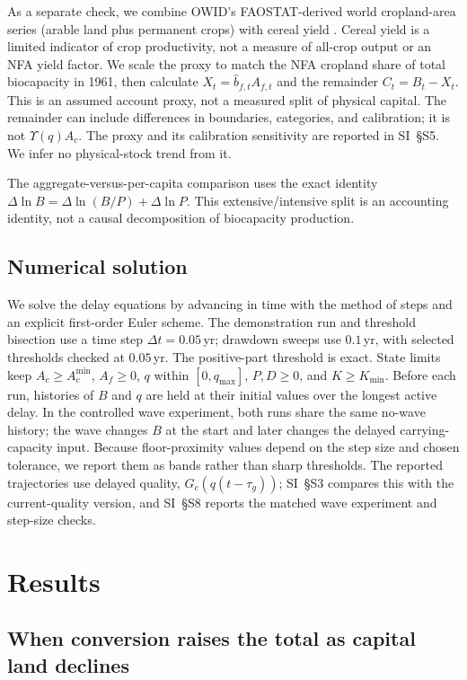 \documentclass[preprint,12pt,authoryear]{elsarticle}
\newcommand{\Acmin}{A_c^{\min}}
\begin{document}
As a separate check, we combine OWID's FAOSTAT-derived world cropland-area series (arable land plus permanent crops) with cereal yield \citep{OWIDCropland2026,OWIDCereal2026}. Cereal yield is a limited indicator of crop productivity, not a measure of all-crop output or an NFA yield factor. We scale the proxy to match the NFA cropland share of total biocapacity in 1961, then calculate $X_t=\hat b_{f,t}A_{f,t}$ and the remainder $C_t=B_t-X_t$. This is an assumed account proxy, not a measured split of physical capital. The remainder can include differences in boundaries, categories, and calibration; it is not $\Upsilon(q)A_c$. The proxy and its calibration sensitivity are reported in SI~\S S5. We infer no physical-stock trend from it.

The aggregate-versus-per-capita comparison uses the exact identity $\Delta\ln B=\Delta\ln(B/P)+\Delta\ln P$. This extensive/intensive split is an accounting identity, not a causal decomposition of biocapacity production.

\subsection{Numerical solution}\label{sec:numerics}

We solve the delay equations by advancing in time with the method of steps and an explicit first-order Euler scheme. The demonstration run and threshold bisection use a time step $\Delta t=0.05$\,yr; drawdown sweeps use $0.1$\,yr, with selected thresholds checked at $0.05$\,yr. The positive-part threshold is exact. State limits keep $A_c\ge\Acmin$, $A_f\ge0$, $q$ within $[0,q_{\max}]$, $P,D\ge0$, and $K\ge K_{\min}$. Before each run, histories of $B$ and $q$ are held at their initial values over the longest active delay. In the controlled wave experiment, both runs share the same no-wave history; the wave changes $B$ at the start and later changes the delayed carrying-capacity input. Because floor-proximity values depend on the step size and chosen tolerance, we report them as bands rather than sharp thresholds. The reported trajectories use delayed quality, $G_c(q(t-\tau_g))$; SI~\S S3 compares this with the current-quality version, and SI~\S S8 reports the matched wave experiment and step-size checks.
\section{Results}\label{sec:results}

\subsection{When conversion raises the total as capital land declines}\label{sec:mask}
\end{document}

